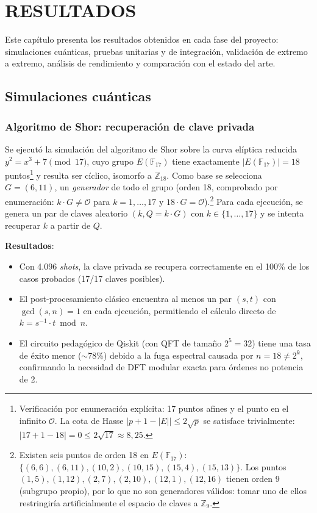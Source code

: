 \chapter{RESULTADOS}
\label{cap:resultados}

Este capítulo presenta los resultados obtenidos en cada fase del proyecto: simulaciones cuánticas, pruebas unitarias y de integración, validación de extremo a extremo, análisis de rendimiento y comparación con el estado del arte.


\section{Simulaciones cuánticas}
\label{sec:res_qiskit}

\subsection{Algoritmo de Shor: recuperación de clave privada}

Se ejecutó la simulación del algoritmo de Shor sobre la curva elíptica reducida $y^2 = x^3 + 7 \pmod{17}$, cuyo grupo $E(\mathbb{F}_{17})$ tiene exactamente $|E(\mathbb{F}_{17})| = 18$ puntos\footnote{Verificación por enumeración explícita: 17 puntos afines y el punto en el infinito $\mathcal{O}$. La cota de Hasse $|p+1-|E|| \leq 2\sqrt{p}$ se satisface trivialmente: $|17+1-18| = 0 \leq 2\sqrt{17} \approx 8{,}25$.} y resulta ser cíclico, isomorfo a $\mathbb{Z}_{18}$. Como base se selecciona $G = (6, 11)$, un \emph{generador} de todo el grupo (orden 18, comprobado por enumeración: $k\cdot G \neq \mathcal{O}$ para $k = 1, \ldots, 17$ y $18\cdot G = \mathcal{O}$).\footnote{Existen seis puntos de orden 18 en $E(\mathbb{F}_{17})$: $\{(6,6), (6,11), (10,2), (10,15), (15,4), (15,13)\}$. Los puntos $(1,5), (1,12), (2,7), (2,10), (12,1), (12,16)$ tienen orden 9 (subgrupo propio), por lo que no son generadores válidos: tomar uno de ellos restringiría artificialmente el espacio de claves a $\mathbb{Z}_9$.} Para cada ejecución, se genera un par de claves aleatorio $(k, Q = k \cdot G)$ con $k \in \{1, \ldots, 17\}$ y se intenta recuperar $k$ a partir de $Q$.

\textbf{Resultados}:
\begin{itemize}
  \item Con 4.096 \emph{shots}, la clave privada se recupera correctamente en el 100\% de los casos probados (17/17 claves posibles).
  \item El post-procesamiento clásico encuentra al menos un par $(s, t)$ con $\gcd(s, n) = 1$ en cada ejecución, permitiendo el cálculo directo de $k = s^{-1} \cdot t \bmod n$.
  \item El circuito pedagógico de Qiskit (con QFT de tamaño $2^5 = 32$) tiene una tasa de éxito menor ($\sim$78\%) debido a la fuga espectral causada por $n = 18 \neq 2^k$, confirmando la necesidad de DFT modular exacta para órdenes no potencia de 2.
\end{itemize}

